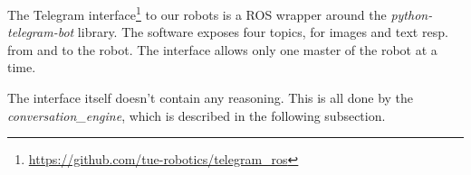 \label{ssec:telegram}
The Telegram interface\footnote{\url{https://github.com/tue-robotics/telegram_ros}} to our robots is a ROS wrapper around the \emph{python-telegram-bot} library. The software exposes four topics, for images and text resp. from and to the robot. The interface allows only one master of the robot at a time.

The interface itself doesn't contain any reasoning. This is all done by the \emph{conversation\_engine}, which is described in the following subsection.
